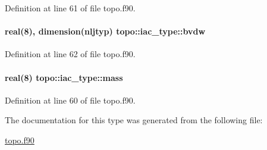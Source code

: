 Definition at line 61 of file topo.\-f90.

\hypertarget{structtopo_1_1iac__type_a74344ad0a75fa91302a6225ed4de57a4}{
\paragraph[{bvdw}]{\setlength{\rightskip}{0pt plus 5cm}real(8), dimension({\bf nljtyp}) topo\-::iac\-\_\-type\-::bvdw}}\label{structtopo_1_1iac__type_a74344ad0a75fa91302a6225ed4de57a4}


Definition at line 62 of file topo.\-f90.

\hypertarget{structtopo_1_1iac__type_ab0e1dbc161092a0b96ecf18007c0f5e1}{
\paragraph[{mass}]{\setlength{\rightskip}{0pt plus 5cm}real(8) topo\-::iac\-\_\-type\-::mass}}\label{structtopo_1_1iac__type_ab0e1dbc161092a0b96ecf18007c0f5e1}


Definition at line 60 of file topo.\-f90.



The documentation for this type was generated from the following file\-:\begin{DoxyCompactItemize}
\item 
\hyperlink{topo_8f90}{topo.\-f90}\end{DoxyCompactItemize}
